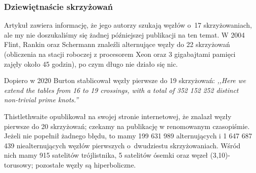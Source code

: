 
\subsubsection{Dziewiętnaście skrzyżowań}
Artykuł \cite{thistlethwaite98} zawiera informację, że jego autorzy szukają węzłów o~17 skrzyżowaniach, ale my nie doszukaliśmy się żadnej późniejszej publikacji na ten temat.
%
%
%
W 2004 Flint, Rankin oraz Schermann \cite{rankin04} znaleźli alternujące węzły do 22 skrzyżowań (obliczenia na stacji roboczej z procesorem Xeon oraz 3 gigabajtami pamięci zajęły około 45 godzin), po czym długo nie działo się nic.
%
%
%

Dopiero w 2020 Burton \cite{burton20} stablicował węzły pierwsze do 19 skrzyżowań: \emph{,,Here we extend the tables from 16 to 19 crossings, with a total of 352 152 252 distinct non-trivial prime knots.''}
%

Thistlethwaite opublikował na swojej stronie internetowej, że znalazł węzły pierwsze do 20 skrzyżowań; czekamy na publikację w renomowanym czasopiśmie.
Jeżeli nie popełnił żadnego błędu, to mamy 199 631 989 alternujących i 1 647 687 439 niealternujących węzłów pierwszych o~dwudziestu skrzyżowaniach.
%
Wśród nich mamy 915 satelitów trójlistnika, 5 satelitów ósemki oraz węzeł (3,10)-torusowy; pozostałe węzły są hiperboliczne.

